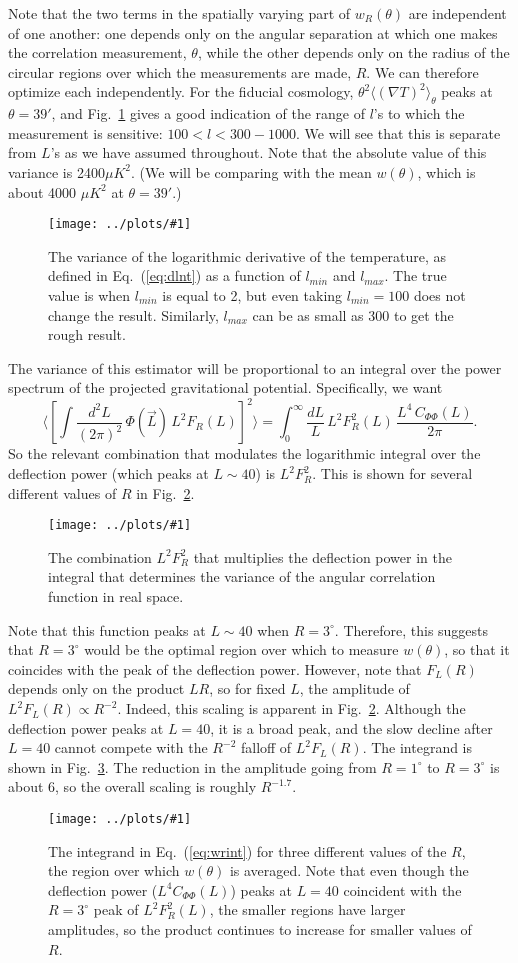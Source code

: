 \documentclass[prd,amsmath,amssymb,floatfix,superscriptaddress,nofootinbib]{revtex4-1}
\def\be{\begin{equation}}
\def\ee{\end{equation}}
\newcommand{\ec}[1]{Eq.~(\ref{eq:#1})}
\newcommand{\eql}[1]{\label{eq:#1}}
\newcommand{\rf}[1]{\ref{fig:#1}}
\newcommand{\sfigg}[2]{
\texttt{[image: ../plots/\#1]}
        }
\newcommand{\Spng}[2]{
   \begin{figure}[thbp]
   \begin{center}
    \sfigg{../plots/#1.png}{.7\columnwidth}
    \caption{{\small #2}}
    \label{fig:#1}
     \end{center}
   \end{figure}
}
\begin{document}
Note that the two terms in the spatially varying part of $w_R(\theta)$ are independent of one another: one depends only on the angular separation at which one makes the correlation measurement, $\theta$, while the other depends only on the radius of the circular regions over which the measurements are made, $R$. We can therefore optimize each independently. For the fiducial cosmology, $\theta^2\langle (\nabla T)^2\rangle_\theta$ peaks at $\theta=39'$, and Fig.~\rf{dlntheta} gives a good indication of the range of $l$'s to which the measurement is sensitive: $100<l<300-1000$. We will see that this is separate from $L$'s as we have assumed throughout. Note that the absolute value of this variance is 2400$\mu K^2$. (We will be comparing with the mean $w(\theta)$, which is about 4000 $\mu K^2$ at $\theta=39'$.) 
\Spng{dlntheta}{The variance of the logarithmic derivative of the temperature, as defined in \ec{dlnt} as a function of $l_{min}$ and $l_{max}$. The true value is when $l_{min}$ is equal to 2, but even taking $l_{min}=100$ does not change the result. Similarly, $l_{max}$ can be as small as 300 to get the rough result.}

The variance of this estimator will be proportional to an integral over the power spectrum of the projected gravitational potential. Specifically,
we want
\be
\langle  \left[\int \frac{d^2L}{(2\pi)^2}\, \Phi(\vec L)\, L^2 F_R(L)\right]^2  \rangle
=
\int_0^\infty \frac{dL}{L}\, L^2F_R^2(L) \, \frac{L^4\, C_{\Phi\Phi}(L)}{2\pi}
.\eql{wrint}\ee
So the relevant combination that modulates the logarithmic integral over the deflection power (which peaks at $L\sim 40$) is $L^2F_R^2$. This is shown for several different values of $R$ in Fig.~\rf{mrsq}.
\Spng{mrsq}{The combination $L^2F_R^2$ that multiplies the deflection power in the integral that determines the variance of the angular correlation function in real space.} 
Note that this function peaks at $L\sim40$ when $R=3^\circ$. Therefore, this suggests that $R=3^\circ$ would be the optimal region over which to measure $w(\theta)$, so that it coincides with the peak of the deflection power. However, note that $F_L(R)$ depends only on the product $LR$, so for fixed $L$, the amplitude of $L^2F_L(R)\propto R^{-2}$. Indeed, this scaling is apparent in Fig.~\rf{mrsq}. Although the deflection power peaks at $L=40$, it is a broad peak, and the slow decline after $L=40$ cannot compete with the $R^{-2}$ falloff of $L^2F_L(R)$. The integrand is shown in Fig.~\rf{wrint}. The reduction in the amplitude going from $R=1^\circ$ to $R=3^\circ$ is about 6, so the overall scaling is roughly $R^{-1.7}$.
\Spng{wrint}{The integrand in \ec{wrint} for three different values of the $R$, the region over which $w(\theta)$ is averaged. Note that even though the deflection power ($L^4C_{\Phi\Phi}(L)$) peaks at $L=40$ coincident with the $R=3^\circ$ peak of $L^2F_R^2(L)$, the smaller regions have larger amplitudes, so the product continues to increase for smaller values of $R$.}
\end{document}
